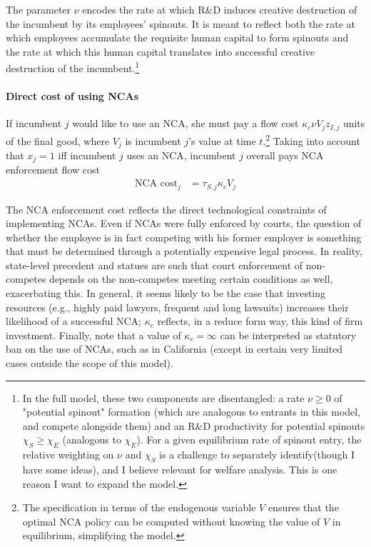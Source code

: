 \documentclass[11pt,english]{article}
\theoremstyle{remark}
\begin{document}
The parameter $\nu$ encodes the rate at which R\&D induces creative destruction of the incumbent by its employees' spinouts. It is meant to reflect both the rate at which employees accumulate the requisite human capital to form spinouts and the rate at which this human capital translates into successful creative destruction of the incumbent.\footnote{In the full model, these two components are disentangled: a rate $\nu \ge 0$ of "potential spinout" formation (which are analogous to entrants in this model, and compete alongside them) and an R\&D productivity for potential spinouts $\chi_S \ge \chi_E$ (analogous to $\chi_E$). For a given equilibrium rate of spinout entry, the relative weighting on $\nu$ and $\chi_S$ is a challenge to separately identify(though I have some ideas), and I believe relevant for welfare analysis. This is one reason I want to expand the model.}

\paragraph{Direct cost of using NCAs} 

If incumbent $j$ would like to use an NCA, she must pay a flow cost $\kappa_{c} \nu V_{j} z_{I,j}$ units of the final good, where $V_{j}$ is incumbent $j$'s value at time $t$.\footnote{The specification in terms of the endogenous variable $V$ ensures that the optimal NCA policy can be computed without knowing the value of $V$ in equilibrium, simplifying the model.} Taking into account that $x_j = 1$ iff incumbent $j$ uses an NCA, incumbent $j$ overall pays NCA enforcement flow cost
\begin{align*}
	\textrm{NCA cost}_{j} &= \tau_{S,j} \kappa_c V_{j}
\end{align*}

The NCA enforcement cost reflects the direct technological constraints of implementing NCAs. Even if NCAs were fully enforced by courts, the question of whether the employee is in fact competing with his former employer is something that must be determined through a potentially expensive legal process. In reality, state-level precedent and statues are such that court enforcement of non-competes depends on the non-competes meeting certain conditions as well, exacerbating this. In general, it seems likely to be the case that investing resources (e.g., highly paid lawyers, frequent and long lawsuits) increases their likelihood of a successful NCA; $\kappa_c$ reflects, in a reduce form way, this kind of firm investment. Finally, note that a value of $\kappa_c = \infty$ can be interpreted as statutory ban on the use of NCAs, such as in California (except in certain very limited cases outside the scope of this model). 
\end{document}
